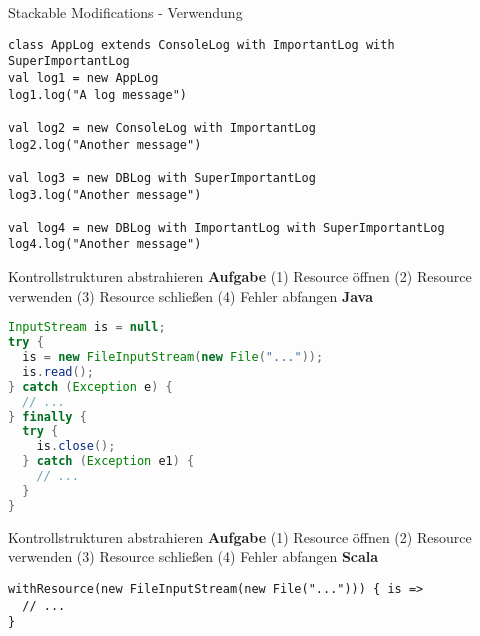 
\begin{frame}[fragile]{Stackable Modifications - Verwendung}
\begin{lstlisting}
class AppLog extends ConsoleLog with ImportantLog with SuperImportantLog
val log1 = new AppLog
log1.log("A log message")

val log2 = new ConsoleLog with ImportantLog
log2.log("Another message")

val log3 = new DBLog with SuperImportantLog
log3.log("Another message")

val log4 = new DBLog with ImportantLog with SuperImportantLog
log4.log("Another message")
\end{lstlisting}
\end{frame}


\begin{frame}[fragile]{Kontrollstrukturen abstrahieren}
\center \textbf{Aufgabe} \linebreak	
(1) Resource öffnen (2) Resource verwenden \linebreak (3) Resource schließen (4) Fehler abfangen
\center \textbf{Java}
\begin{lstlisting}[language=java]
InputStream is = null;
try {
  is = new FileInputStream(new File("..."));
  is.read();
} catch (Exception e) {
  // ...
} finally {
  try {
    is.close();
  } catch (Exception e1) {
    // ...
  }
}
\end{lstlisting}
\end{frame}  


\begin{frame}[fragile]{Kontrollstrukturen abstrahieren}
\center \textbf{Aufgabe} \linebreak	
(1) Resource öffnen (2) Resource verwenden \linebreak (3) Resource schließen (4) Fehler abfangen
\center \textbf{Scala}
\begin{lstlisting}
withResource(new FileInputStream(new File("..."))) { is =>
  // ...
}
\end{lstlisting}
\end{frame}  


